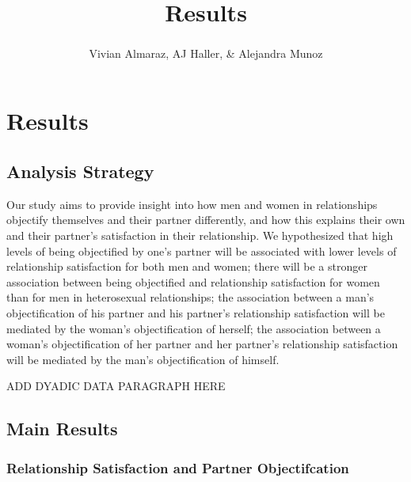 \documentclass[
  english,
  man]{apa6}
\title{Results}
\author{Vivian Almaraz\textsuperscript{}, AJ Haller\textsuperscript{}, \& Alejandra Munoz\textsuperscript{}}
\date{}
\affiliation{\phantom{0}}
\begin{document}
\maketitle

\hypertarget{results}{%
\section{Results}\label{results}}

\hypertarget{analysis-strategy}{%
\subsection{Analysis Strategy}\label{analysis-strategy}}

Our study aims to provide insight into how men and women in relationships objectify themselves and their partner differently, and how this explains their own and their partner's satisfaction in their relationship. We hypothesized that high levels of being objectified by one's partner will be associated with lower levels of relationship satisfaction for both men and women; there will be a stronger association between being objectified and relationship satisfaction for women than for men in heterosexual relationships; the association between a man's objectification of his partner and his partner's relationship satisfaction will be mediated by the woman's objectification of herself; the association between a woman's objectification of her partner and her partner's relationship satisfaction will be mediated by the man's objectification of himself.

ADD DYADIC DATA PARAGRAPH HERE

\hypertarget{main-results}{%
\subsection{Main Results}\label{main-results}}

\hypertarget{relationship-satisfaction-and-partner-objectifcation}{%
\subsubsection{Relationship Satisfaction and Partner Objectifcation}\label{relationship-satisfaction-and-partner-objectifcation}}
\end{document}
